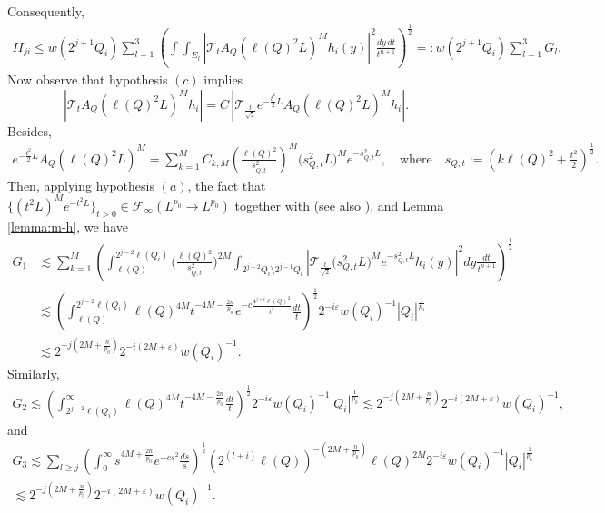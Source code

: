 \documentclass[11pt, a4paper,leqno]{amsart}
\theoremstyle{plain}
\theoremstyle{definition}
\theoremstyle{remark}
\numberwithin{equation}{section}
\def \iint{\int\!\!\!\int}
\begin{document}
Consequently,
\begin{align*}
II_{ji}\leq w(2^{j+1}Q_i)\sum_{l=1}^{3}\left(\iint_{E_l}|\mathcal{T}_tA_Q(\ell(Q)^2L)^Mh_i(y)|^2\frac{dy\,dt}{t^{n+1}}\right)^{\frac{1}{2}}
=:
w(2^{j+1}Q_i)\sum_{l=1}^{3}G_l.
 \end{align*}
Now observe that hypothesis $(c)$ implies
$$
|\mathcal{T}_tA_Q(\ell(Q)^2L)^Mh_i|=C\,|\mathcal{T}_{\frac{t}{\sqrt{2}}}e^{-\frac{t^2}{2}L}A_Q(\ell(Q)^2L)^Mh_i|.
$$
Besides,
\begin{align*}
e^{-\frac{t^2}{2}L}A_Q(\ell(Q)^2L)^M
=
\sum_{k=1}^M C_{k,M}\left(\frac{\ell(Q)^2}{s_{Q,t}^2}\right)^M\big(s_{Q,t}^2L\big)^Me^{-s_{Q,t}^2L},
\quad\textrm{where}\quad s_{Q,t}:=\left(k\ell(Q)^2+\frac{t^2}{2}\right)^{\frac{1}{2}}.
\end{align*}
Then, applying hypothesis $(a)$, the fact that $\{(t^2 L)^M e^{-t^2L}\}_{t>0}\in \mathcal{F}_{\infty}(L^{p_0}\rightarrow L^{p_0})$ together with \cite[Lemma 2.1]{MartellPrisuelos} (see also \cite[Lemma 2.3]{HofmannMartell}), and Lemma \ref{lemma:m-h},  we have
\begin{align*}
G_1
& \lesssim \sum_{k=1}^M\left(\int_{\ell(Q)}^{2^{j-2}\ell(Q_i)}
\Bigg(\frac{\ell(Q)^2}{s_{Q,t}^2}\Bigg)^{2M}
\int_{2^{j+2}Q_i\setminus 2^{j-1}Q_i}
|\mathcal{T}_{\frac{t}{\sqrt{2}}}\big(s_{Q,t}^2L \big)^M e^{-s_{Q,t}^2L}h_i(y)|^2dy \frac{dt}{t^{n+1}}\right)^{\frac{1}{2}}
\\
& \lesssim
\left(\int_{\ell(Q)}^{2^{j-2}\ell(Q_i)}
\ell(Q)^{4M}t^{-4M-\frac{2n}{p_0}
}e^{-c\frac{4^{j+i}\ell(Q)^2}{t^2}}
\frac{dt}{t}\right)^{\frac{1}{2}}2^{-i\varepsilon}w(Q_i)^{-1}|Q_i|^{\frac{1}{p_0}}
\\
&\lesssim
2^{-j\left(2M+\frac{n}{p_0}\right)}2^{-i(2M+\varepsilon)}
w(Q_i)^{-1}.
 \end{align*}
Similarly,
\begin{align*}
G_2
\lesssim
\left(\int_{2^{j-2}\ell(Q_i)}^{\infty}
\ell(Q)^{4M}t^{-4M-\frac{2n}{p_0}}
\frac{dt}{t}\right)^{\frac{1}{2}}2^{-i\varepsilon}w(Q_i)^{-1}|Q_i|^{\frac{1}{p_0}}
 \lesssim
2^{-j\left(2M+\frac{n}{p_0}\right)}
2^{-i(2M+\varepsilon)}w(Q_i)^{-1},
 \end{align*}
 and
\begin{multline*}
G_3
\lesssim\sum_{l\geq j}
\left(\int_0^{\infty}
s^{4M+\frac{2n}{p_0}
}e^{-cs^2}
\frac{ds}{s}\right)^{\frac{1}{2}}(2^{(l+i)}\ell(Q))^{-\left(2M+\frac{n}{p_0}\right)}
\ell(Q)^{2M}2^{-i\varepsilon}w(Q_i)^{-1}|Q_i|^{\frac{1}{p_0}}
\\
\lesssim
2^{-j\left(2M+\frac{n}{p_0}\right)}
2^{-i(2M+\varepsilon)}w(Q_i)^{-1}.
 \end{multline*}
\end{document}
